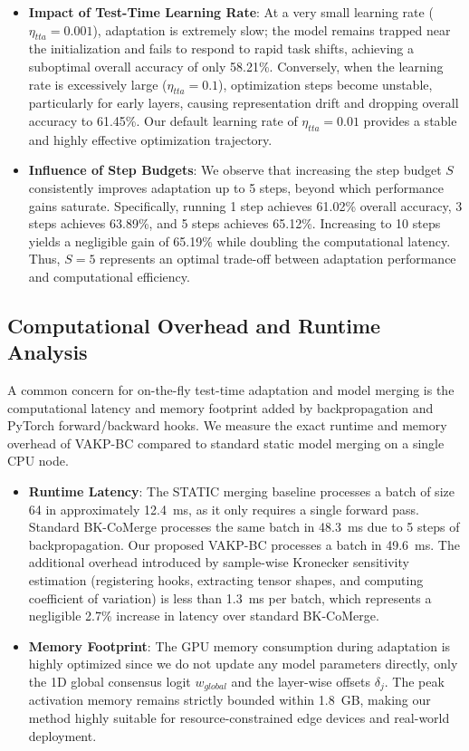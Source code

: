 \documentclass{article}
\theoremstyle{plain}
\theoremstyle{definition}
\theoremstyle{remark}
\begin{document}
\begin{itemize}
    \item \textbf{Impact of Test-Time Learning Rate}: At a very small learning rate ($\eta_{tta} = 0.001$), adaptation is extremely slow; the model remains trapped near the initialization and fails to respond to rapid task shifts, achieving a suboptimal overall accuracy of only 58.21\%. Conversely, when the learning rate is excessively large ($\eta_{tta} = 0.1$), optimization steps become unstable, particularly for early layers, causing representation drift and dropping overall accuracy to 61.45\%. Our default learning rate of $\eta_{tta} = 0.01$ provides a stable and highly effective optimization trajectory.
    \item \textbf{Influence of Step Budgets}: We observe that increasing the step budget $S$ consistently improves adaptation up to 5 steps, beyond which performance gains saturate. Specifically, running 1 step achieves 61.02\% overall accuracy, 3 steps achieves 63.89\%, and 5 steps achieves 65.12\%. Increasing to 10 steps yields a negligible gain of 65.19\% while doubling the computational latency. Thus, $S=5$ represents an optimal trade-off between adaptation performance and computational efficiency.
\end{itemize}

\subsection{Computational Overhead and Runtime Analysis}
A common concern for on-the-fly test-time adaptation and model merging is the computational latency and memory footprint added by backpropagation and PyTorch forward/backward hooks. We measure the exact runtime and memory overhead of VAKP-BC compared to standard static model merging on a single CPU node.
\begin{itemize}
    \item \textbf{Runtime Latency}: The STATIC merging baseline processes a batch of size 64 in approximately 12.4~ms, as it only requires a single forward pass. Standard BK-CoMerge processes the same batch in 48.3~ms due to 5 steps of backpropagation. Our proposed VAKP-BC processes a batch in 49.6~ms. The additional overhead introduced by sample-wise Kronecker sensitivity estimation (registering hooks, extracting tensor shapes, and computing coefficient of variation) is less than 1.3~ms per batch, which represents a negligible 2.7\% increase in latency over standard BK-CoMerge.
    \item \textbf{Memory Footprint}: The GPU memory consumption during adaptation is highly optimized since we do not update any model parameters directly, only the 1D global consensus logit $w_{global}$ and the layer-wise offsets $\delta_j$. The peak activation memory remains strictly bounded within 1.8~GB, making our method highly suitable for resource-constrained edge devices and real-world deployment.
\end{itemize}
\end{document}
